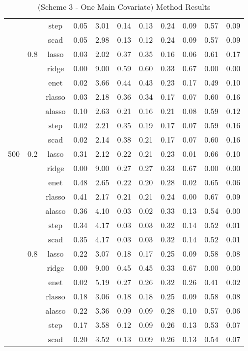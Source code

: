 \begin{table}[H]
{\begin{tabular}{c c c|c|c|c c|c c c c}
        & &step &0.05 &3.01 &0.14 &0.13 &0.24 &0.09 &0.57 &0.09\\
        & &scad &0.05 &2.98 &0.13 &0.12 &0.24 &0.09 &0.57 &0.09\\
        \cline{2-11}
        &0.8 &lasso &0.03 &2.02 &0.37 &0.35 &0.16 &0.06 &0.61 &0.17\\
        & &ridge &0.00 &9.00 &0.59 &0.60 &0.33 &0.67 &0.00&0.00\\
        & &enet &0.02 &3.66 &0.44 &0.43 &0.23 &0.17 &0.49 &0.10\\
        & &rlasso &0.03 &2.18 &0.36 &0.34 &0.17 &0.07 &0.60 &0.16\\
        & &alasso &0.10&2.63 &0.21 &0.16 &0.21 &0.08 &0.59 &0.12\\
        & &step &0.02 &2.21 &0.35 &0.19 &0.17 &0.07 &0.59 &0.16\\
        & &scad &0.02 &2.14 &0.38 &0.21 &0.17 &0.07 &0.60 &0.16\\
        \hline
        500 &0.2 &lasso &0.31 &2.12 &0.22 &0.21 &0.23 &0.01 &0.66 &0.10\\
        & &ridge &0.00 &9.00 &0.27 &0.27 &0.33 &0.67 &0.00&0.00\\
        & &enet &0.48 &2.65 &0.22 &0.20 &0.28 &0.02 &0.65 &0.06\\
        & &rlasso &0.41 &2.17 &0.21 &0.21 &0.24 &0.00&0.67 &0.09\\
        & &alasso &0.36 &4.10 &0.03 &0.02 &0.33 &0.13 &0.54 &0.00\\
        & &step &0.34 &4.17 &0.03 &0.03 &0.32 &0.14 &0.52 &0.01\\
        & &scad &0.35 &4.17 &0.03 &0.03 &0.32 &0.14 &0.52 &0.01\\
        \cline{2-11}
        &0.8 &lasso &0.22 &3.07 &0.18 &0.17 &0.25 &0.09 &0.58 &0.08\\
        & &ridge &0.00 &9.00 &0.45 &0.45 &0.33 &0.67 &0.00&0.00\\
        & &enet &0.02 &5.19 &0.27 &0.26 &0.32 &0.26 &0.41 &0.02\\
        & &rlasso &0.18 &3.06 &0.18 &0.18 &0.25 &0.09 &0.58 &0.08\\
        & &alasso &0.22 &3.36 &0.09 &0.09 &0.28 &0.10&0.57 &0.06\\
        & &step &0.17 &3.58 &0.12 &0.09 &0.26 &0.13 &0.53 &0.07\\
        & &scad &0.20 &3.52 &0.13 &0.09 &0.26 &0.13 &0.54 &0.07\\
        \hline
    \end{tabular}
    }
    \caption{(Scheme 3 - One Main Covariate) Method Results}
    \label{tbl:scheme-3-results}
\end{table}